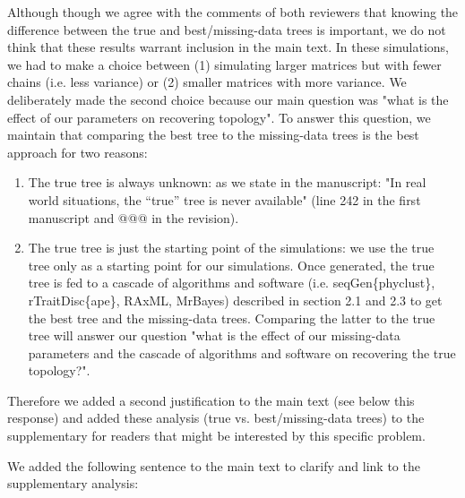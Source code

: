 \documentclass[12pt,letterpaper]{article}
\begin{document}
\begin{enumerate}

Although though we agree with the comments of both reviewers that knowing the difference between the true and best/missing-data trees is important, we do not think that these results warrant inclusion in the main text.
In these simulations, we had to make a choice between (1) simulating larger matrices but with fewer chains (i.e. less variance) or (2) smaller matrices with more variance.
We deliberately made the second choice because our main question was "what is the effect of our parameters on recovering topology".
To answer this question, we maintain that comparing the best tree to the missing-data trees is the best approach for two reasons:
\begin{enumerate}
\item{The true tree is always unknown:} as we state in the manuscript: "In real world situations, the ``true'' tree is never available" (line 242 in the first manuscript and @@@ in the revision).
\item{The true tree is just the starting point of the simulations:} we use the true tree only as a starting point for our simulations.
Once generated, the true tree is fed to a cascade of algorithms and software (i.e. seqGen\{phyclust\}, rTraitDisc\{ape\}, RAxML, MrBayes) described in section 2.1 and 2.3 to get the best tree and the missing-data trees.
Comparing the latter to the true tree will answer our question "what is the effect of our missing-data parameters and the cascade of algorithms and software on recovering the true topology?".
\end{enumerate}
Therefore we added a second justification to the main text (see below this response) and added these analysis (true vs. best/missing-data trees) to the supplementary for readers that might be interested by this specific problem.

We added the following sentence to the main text to clarify and link to the supplementary analysis:


\end{enumerate}
\end{document}

